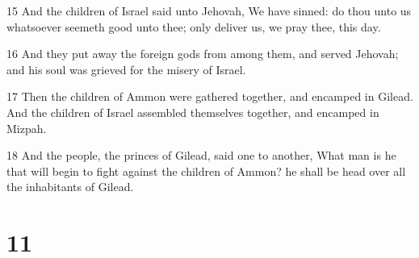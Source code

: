 \par 15 And the children of Israel said unto Jehovah, We have sinned: do thou unto us whatsoever seemeth good unto thee; only deliver us, we pray thee, this day.
\par 16 And they put away the foreign gods from among them, and served Jehovah; and his soul was grieved for the misery of Israel.
\par 17 Then the children of Ammon were gathered together, and encamped in Gilead. And the children of Israel assembled themselves together, and encamped in Mizpah.
\par 18 And the people, the princes of Gilead, said one to another, What man is he that will begin to fight against the children of Ammon? he shall be head over all the inhabitants of Gilead.

\chapter{11}

